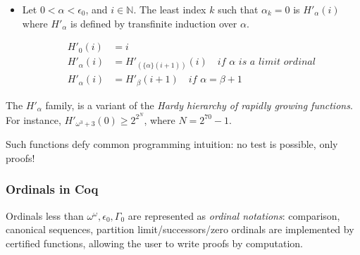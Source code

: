 \documentclass[10pt]{beamer}
\makeatletter
\newcommand{\coq}{Coq\xspace}
\newcommand{\pathtomovies}{.}
\newcommand{\inputsnippets}[1]
{{\setlength{\itemsep}{1pt}\setlength{\parsep}{0pt}%
    \alectryon@copymacros\begin{io}
      \forcsvlist{\item\@inputsnippet}{#1}
    \end{io}}}
\let@old Save definition of 
\newcommand{\@inputsnippet}[1]
{{\renewenvironment{alectryon}{}{}%
    @old{{\pathtomovies}/#1}}}
\newcommand{\canonseq}[2]{\mbox{$\{#1\}(#2)$}}
\makeatother
\begin{document}
\begin{frame}
  \begin{block}{}
    \begin{itemize}
    \item Let \textcolor{mathcolor}{$0<\alpha<\epsilon_0$}, and \textcolor{mathcolor}{$i\in\mathbb{N}$}.
      The least index \textcolor{mathcolor}{$k$} such that \textcolor{mathcolor}{$\alpha_k=0$} is  \textcolor{mathcolor}{$H'_\alpha(i)$} where \textcolor{mathcolor}{$H'_\alpha$} is defined by transfinite induction over \textcolor{mathcolor}{$\alpha$}.

      \begin{align}
        H'_0(i) & = i\\
        H'_\alpha(i) &= H'_{(\canonseq{\alpha}{i+1})}(i)  \quad\textit{if $\alpha$ is a limit ordinal}\\
        H'_{\alpha}(i) &=H'_\beta(i+1) \quad\textit{if $\alpha=\beta+1$}
      \end{align}

    \end{itemize}
  \end{block}

  \begin{block}{}
    The \textcolor{mathcolor}{$H'_\alpha$} family,  is a variant of the  \emph{Hardy hierarchy of rapidly growing functions}. For instance, \textcolor{mathcolor}{$H'_{\omega^3+3}(0)\geq2^{2^N}$}, where \textcolor{mathcolor}{$N=2^{70}-1$}.

    {\color{lookcolor} Such functions defy common programming intuition: no test is possible, only proofs!}
  \end{block}
  
\end{frame}


\begin{frame}
  \frametitle{Ordinals in \coq}
  
  \begin{block}{}
    Ordinals less than {\color{mathcolor}$\omega^\omega, \epsilon_0,  \Gamma_0$} are represented as \emph{ordinal notations}: comparison, canonical sequences, partition limit/successors/zero ordinals are implemented by certified functions, allowing the user to write proofs by computation.

    \begin{footnotesize}
      \inputsnippets{./ONDef}

      \inputsnippets{../E0_Ex42}
    \end{footnotesize}

    
    
  \end{block}
\end{frame}
\end{document}
